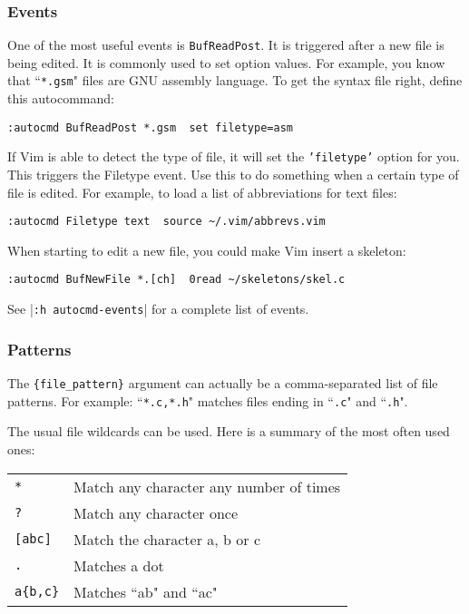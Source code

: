 \subsubsection{Events}
One of the most useful events is \texttt{BufReadPost}.
It is triggered after a new file is being edited.
It is commonly used to set option values.
For example, you know that ``\texttt{*.gsm}" files are GNU assembly language.
To get the syntax file right, define this autocommand:

\begin{Verbatim}[samepage=true]
 :autocmd BufReadPost *.gsm  set filetype=asm
\end{Verbatim}

If Vim is able to detect the type of file, it will set the \texttt{'filetype'} option for you.
This triggers the Filetype event.
Use this to do something when a certain type of file is edited.
For example, to load a list of abbreviations for text files:

\begin{Verbatim}[samepage=true]
 :autocmd Filetype text  source ~/.vim/abbrevs.vim
\end{Verbatim}

When starting to edit a new file, you could make Vim insert a skeleton:

\begin{Verbatim}[samepage=true]
 :autocmd BufNewFile *.[ch]  0read ~/skeletons/skel.c
\end{Verbatim}

See |\texttt{:h autocmd-events}| for a complete list of events.

\subsubsection{Patterns}
The \texttt{\{file\_pattern\}} argument can actually be a comma-separated list of file patterns.
For example: ``\texttt{*.c,*.h}" matches files ending in ``\texttt{.c}" and ``\texttt{.h}".

The usual file wildcards can be used.
Here is a summary of the most often used ones:

\begin{center} \begin{tabular}{l l}
				\texttt{*} & Match any character any number of times \\
				\texttt{?} & Match any character once \\
				\texttt{[abc]} & Match the character a, b or c \\
				\texttt{.} & Matches a dot \\
				\texttt{a\{b,c\}} & Matches ``ab" and ``ac" \\
\end{tabular} \end{center}

